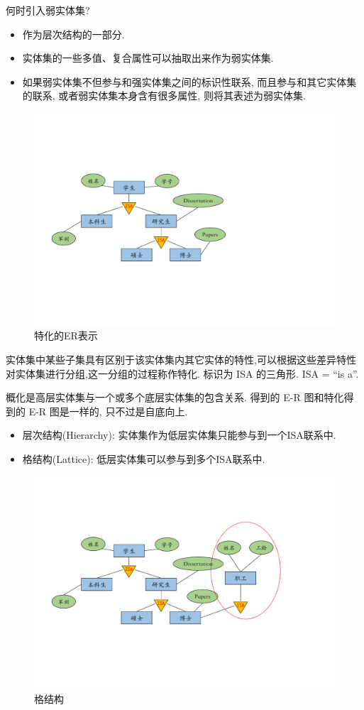 \begin{remark}
    何时引入弱实体集?
    \begin{itemize}
        \item 作为层次结构的一部分.
        \item 实体集的一些多值、复合属性可以抽取出来作为弱实体集.
        \item 如果弱实体集不但参与和强实体集之间的标识性联系, 
        而且参与和其它实体集的联系, 或者弱实体集本身含有很多属性, 则将其表述为弱实体集.
    \end{itemize}
\end{remark}

\begin{figure}[H]
    \centering
    \includegraphics[width=.6\textwidth]{figure/特化.pdf}
    \caption{特化的ER表示}
\end{figure}

\begin{definition}[特化]
    实体集中某些子集具有区别于该实体集内其它实体的特性,可以根据这些差异特性对实体集进行分组,这一分组的过程称作特化. 标识为 ISA 的三角形. ISA = “is a”.
\end{definition}

\begin{definition}[概化]
    概化是高层实体集与一个或多个底层实体集的包含关系. 得到的 E-R 图和特化得到的 E-R 图是一样的, 只不过是自底向上.
\end{definition}

\begin{itemize}
    \item 层次结构(Hierarchy): 实体集作为低层实体集只能参与到一个ISA联系中.
    \item 格结构(Lattice): 低层实体集可以参与到多个ISA联系中.
\end{itemize}

\begin{figure}[H]
    \centering
    \includegraphics[width=.7\textwidth]{figure/格结构.pdf}
    \caption{格结构}
\end{figure}

